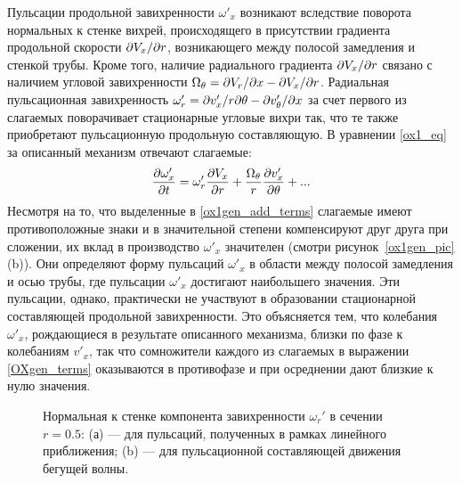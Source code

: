 Пульсации продольной завихренности $\omega'_x$ возникают вследствие поворота нормальных к стенке вихрей, происходящего в присутствии градиента продольной скорости $\partial V_x/ \partial r$, возникающего между полосой замедления и стенкой трубы. Кроме того, наличие радиального градиента $\partial V_x/ \partial r$ связано с наличием угловой завихренности $\Omega_\theta = \partial V_r / \partial x - \partial V_x / \partial r$. Радиальная пульсационная завихренность $\omega'_r = \partial v'_x / r \partial \theta - \partial v'_\theta / \partial x$ за счет первого из слагаемых поворачивает стационарные угловые вихри так, что те также приобретают пульсационную продольную составляющую. В уравнении \eqref{ox1_eq} за описанный механизм отвечают слагаемые:
\begin{equation}\label{ox1gen_add_terms}
\frac{\partial \omega'_x}{\partial t} = \omega'_r \frac {\partial V_x}{\partial r} + \frac{\Omega_\theta}{r} \frac{\partial v'_x}{\partial \theta} + ...
\end{equation}
Несмотря на то, что выделенные в \eqref{ox1gen_add_terms} слагаемые имеют противоположные знаки и в значительной степени компенсируют друг друга при сложении, их вклад в производство $\omega'_x$ значителен (смотри рисунок~\ref{ox1gen_pic}(b)). Они определяют форму пульсаций $\omega'_x$ в области между полосой замедления и осью трубы, где пульсации $\omega'_x$ достигают наибольшего значения. Эти пульсации, однако, практически не участвуют в образовании стационарной составляющей продольной завихренности. Это объясняется тем, что колебания $\omega'_x$, рождающиеся в результате описанного механизма, близки по фазе к колебаниям $v'_x$, так что сомножители каждого из слагаемых в выражении \eqref{OXgen_terms} оказываются в противофазе и при осреднении дают близкие к нулю значения.

\begin{figure}
\caption{Нормальная к стенке компонента завихренности $\omega_r'$ в сечении $r = 0.5$: (а) --- для пульсаций, полученных в рамках линейного приближения; (b) --- для пульсационной составляющей движения бегущей волны. }
\label{pipetw_or1_pic}
\end{figure}

